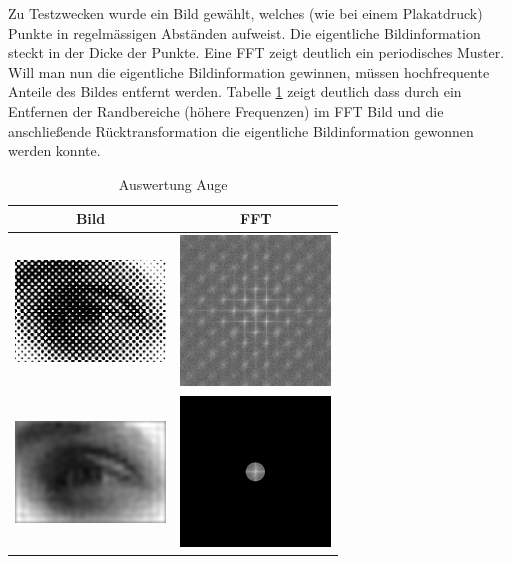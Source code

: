 \documentclass[12pt,german]{article}
\begin{document}
Zu Testzwecken wurde ein Bild gewählt, welches (wie bei einem Plakatdruck) Punkte in regelmässigen Abständen aufweist. Die eigentliche Bildinformation steckt in der Dicke der Punkte. Eine FFT zeigt deutlich ein periodisches Muster. Will man nun die eigentliche Bildinformation gewinnen, müssen hochfrequente Anteile des Bildes entfernt werden. Tabelle \ref{tab:AuswertungAuge} zeigt deutlich dass durch ein Entfernen der Randbereiche (höhere Frequenzen) im FFT Bild und die anschließende Rücktransformation die eigentliche Bildinformation gewonnen werden konnte.
\begin{table}[H]
  \centering
  \begin{tabular}{c | c}
    \hline
    Bild & FFT \\
    \hline
	\includegraphics[width=4cm]{../testData/Auge.jpg} & \includegraphics[width=4cm]{../testData/Results/Auge/FFT_of_Auge.jpg} \\
    \hline
    \includegraphics[width=4cm]{../testData/Results/Auge/reduced_Auge.jpg} & \includegraphics[width=4cm]{../testData/Results/Auge/reduced_FFT_of_Auge.jpg} \\
  \end{tabular}
  \caption{Auswertung Auge}
  \label{tab:AuswertungAuge}
\end{table}
\end{document}

